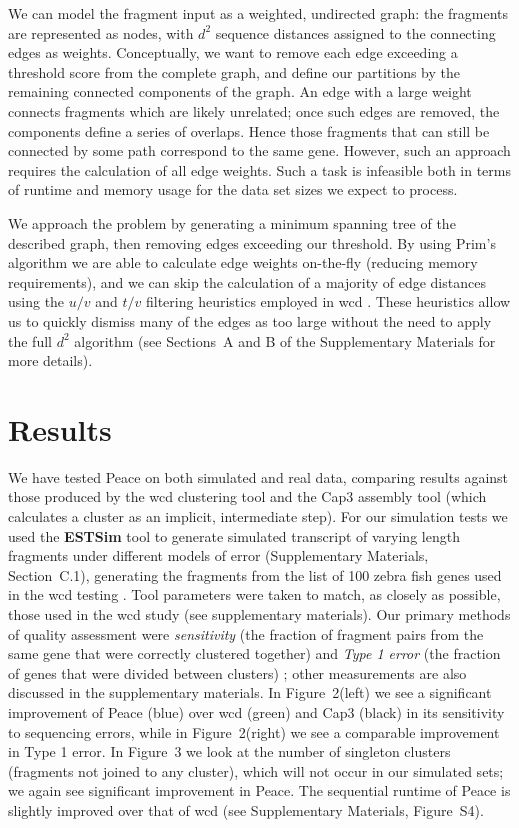 \documentclass[a4,center,fleqn]{NAR}
\begin{document}
We can model the fragment input as a weighted, undirected graph: the fragments
are represented as nodes, with $d^2$ sequence distances assigned to
the connecting edges as weights.  Conceptually, we want to remove each
edge exceeding a threshold score from the complete graph, and define
our partitions by the remaining connected components of the graph.  An
edge with a large weight connects fragments which are likely unrelated;
once such edges are removed, the components define a series of
overlaps.  Hence those fragments that can still be connected by some path
correspond to the same gene.  However, such an approach requires the
calculation of all edge weights.  Such a task is infeasible both in terms of
runtime and memory usage for the data set sizes we expect to process.

We approach the problem by generating a minimum spanning tree of the
described graph, then removing edges exceeding our threshold.  By
using Prim's algorithm we are able to calculate edge weights
on-the-fly (reducing memory requirements), and we can skip the
calculation of a majority of edge distances using the $u/v$ and $t/v$
filtering heuristics employed in {\sc wcd} \cite{Hazelhurst08a}.
These heuristics allow us to quickly dismiss many of the edges as too
large without the need to apply the full $d^2$ algorithm (see
Sections~A and B of the Supplementary Materials for more details). 

\section{Results}

We have tested {\sc Peace} on both simulated and real data,
comparing results against those produced by the {\sc wcd}
clustering tool \cite{Hazelhurst08a} and the {\sc Cap3} assembly
tool \cite{Huang99} (which calculates a cluster as an implicit, intermediate
step).  For our simulation tests we used the {\bf ESTSim} tool
\cite{Hazelhurst03} to generate simulated transcript of varying length
fragments under different models
of error (Supplementary Materials, Section~C.1),
generating the fragments from the list of 100 zebra fish genes used in
the {\sc wcd} testing \cite{Hazelhurst08a}.  Tool parameters were
taken to match, as closely as possible, those used in the {\sc wcd}
study (see supplementary materials).  Our primary methods of quality
assessment were {\it sensitivity} (the fraction of fragment pairs from the
same gene that were correctly clustered together) and {\it Type 1
  error} (the fraction of genes that were divided between clusters)
\cite{Wang04,Hazelhurst08a}; other measurements are also discussed
in the supplementary materials.  In Figure~2(left) we see a
significant improvement of {\sc Peace} (blue) over {\sc wcd}
(green) and {\sc Cap3} (black) in its sensitivity to sequencing
errors, while in Figure~2(right) we see a comparable
improvement in Type 1 error.  In Figure~3 we look at
the number of singleton clusters (fragments not joined to any cluster),
which will not occur in our simulated sets; we again see significant
improvement in {\sc Peace}.  The sequential runtime of
{\sc Peace} is slightly improved over that of {\sc wcd} (see
Supplementary Materials, Figure~S4).
\end{document}
